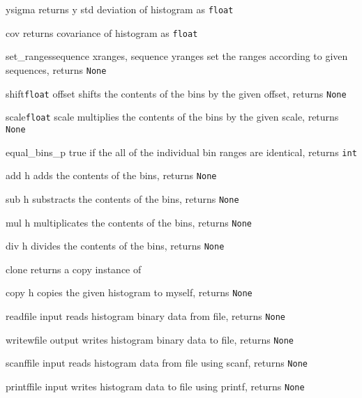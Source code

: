 \begin{methoddesc}{ysigma}{}
returns y std deviation of histogram \hfill as \texttt{float}
\end{methoddesc}
\begin{methoddesc}{cov}{}
returns covariance of histogram \hfill as \texttt{float}
\end{methoddesc}
\begin{methoddesc}{set_ranges}{sequence xranges, sequence yranges}
set the ranges according to given sequences, \hfill returns \texttt{None}
\end{methoddesc}
\begin{methoddesc}{shift}{\texttt{float} offset}
shifts the contents of the bins by the given offset, \hfill returns \texttt{None}
\end{methoddesc}
\begin{methoddesc}{scale}{\texttt{float} scale}
multiplies the contents of the bins by the given scale, \hfill returns \texttt{None}
\end{methoddesc}
\begin{methoddesc}{equal_bins_p}{}
true if the all of the individual bin ranges are identical, \hfill returns \texttt{int}
\end{methoddesc}
\begin{methoddesc}{add}{ h}
adds the contents of the bins, \hfill returns \texttt{None}
\end{methoddesc}
\begin{methoddesc}{sub}{ h}
substracts the contents of the bins, \hfill returns \texttt{None}
\end{methoddesc}
\begin{methoddesc}{mul}{ h}
multiplicates the contents of the bins, \hfill returns \texttt{None}
\end{methoddesc}
\begin{methoddesc}{div}{ h}
divides the contents of the bins, \hfill returns \texttt{None}
\end{methoddesc}
\begin{methoddesc}{clone}{}
returns a copy instance of \hfill{}
\end{methoddesc}
\begin{methoddesc}{copy}{ h}
copies the given histogram to myself, \hfill returns \texttt{None}
\end{methoddesc}
\begin{methoddesc}{read}{file input}
reads histogram binary data from file, \hfill returns \texttt{None}
\end{methoddesc}
\begin{methoddesc}{writew}{file output}
writes histogram binary data to file, \hfill returns \texttt{None}
\end{methoddesc}
\begin{methoddesc}{scanf}{file input}
reads histogram data from file using scanf, \hfill returns \texttt{None}
\end{methoddesc}
\begin{methoddesc}{printf}{file input}
writes histogram data to file using printf, \hfill returns \texttt{None}
\end{methoddesc}

